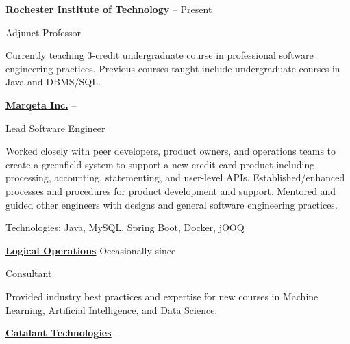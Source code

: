 \documentclass[letterpaper,MMMMyyyy,nonstopmode]{simpleresumecv}
\newif\ifLOCATION
\begin{document}
\begin{Body}
\begin{Detail}
\end{Detail}

\BigGap

\Entry
\href{http://ist.rit.edu/}
{\textbf{Rochester Institute of Technology}}
\hfill
{} --
Present

Adjunct Professor
\ifLOCATION
\hfill 
Rochester, New York
\fi

\begin{Detail}
\BulletItem
Currently teaching 3-credit undergraduate course in professional software engineering practices.
\BulletItem
Previous courses taught include undergraduate courses in Java and DBMS/SQL.
\end{Detail}

\BigGap
\Entry
\href{https://www.marqeta.com}
{\textbf{Marqeta Inc.}}
\hfill
{} -- 

Lead Software Engineer
\ifLOCATION
\hfill
Rochester, New York
\fi

\begin{Detail}
\BulletItem
Worked closely with peer developers, product owners, and operations teams to create a greenfield system to support a new credit card product including processing, accounting, statementing, and user-level APIs.
\BulletItem
Established/enhanced processes and procedures for product development and support.
\BulletItem
Mentored and guided other engineers with designs and general software engineering practices.

\Gap
Technologies: Java, MySQL, Spring Boot, Docker, jOOQ

\end{Detail}

\BigGap

\Entry
\href{http://logicalopertions.com/}
{\textbf{Logical Operations}}
\hfill
Occasionally since 

Consultant
\ifLOCATION
\hfill 
Rochester, New York
\fi

\begin{Detail}
\BulletItem
Provided industry best practices and expertise for new courses in Machine Learning, Artificial Intelligence, and Data Science.
\end{Detail}

\BigGap

\Entry
\href{http://www.gocatalant.com}
{\textbf{Catalant Technologies}}
\hfill
 -- 


\end{Body}
\end{document}
